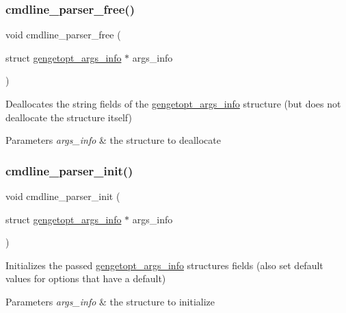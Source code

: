 \subsubsection{\texorpdfstring{cmdline\+\_\+parser\+\_\+free()}{cmdline\_parser\_free()}}
{\footnotesize\ttfamily void cmdline\+\_\+parser\+\_\+free (\begin{DoxyParamCaption}\item[{struct \hyperlink{structgengetopt__args__info}{gengetopt\+\_\+args\+\_\+info} $\ast$}]{args\+\_\+info }\end{DoxyParamCaption})}

Deallocates the string fields of the \hyperlink{structgengetopt__args__info}{gengetopt\+\_\+args\+\_\+info} structure (but does not deallocate the structure itself) 
\begin{DoxyParams}{Parameters}
{\em args\+\_\+info} & the structure to deallocate \\
\hline
\end{DoxyParams}
\mbox{\label{des-getopt_8h_aca62b50d03d0d082968eeb1940f98650}} 
\subsubsection{\texorpdfstring{cmdline\+\_\+parser\+\_\+init()}{cmdline\_parser\_init()}}
{\footnotesize\ttfamily void cmdline\+\_\+parser\+\_\+init (\begin{DoxyParamCaption}\item[{struct \hyperlink{structgengetopt__args__info}{gengetopt\+\_\+args\+\_\+info} $\ast$}]{args\+\_\+info }\end{DoxyParamCaption})}

Initializes the passed \hyperlink{structgengetopt__args__info}{gengetopt\+\_\+args\+\_\+info} structure\textquotesingle{}s fields (also set default values for options that have a default) 
\begin{DoxyParams}{Parameters}
{\em args\+\_\+info} & the structure to initialize \\
\hline
\end{DoxyParams}
\mbox{\label{des-getopt_8h_afd778af110fe0ee1ea5eac7aa9939d92}} 

